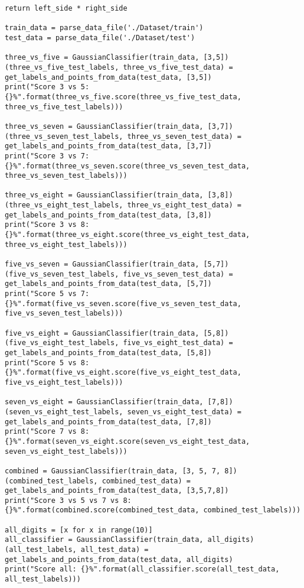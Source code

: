 \begin{lstlisting}[style]
        return left_side * right_side

train_data = parse_data_file('./Dataset/train')
test_data = parse_data_file('./Dataset/test')

three_vs_five = GaussianClassifier(train_data, [3,5])
(three_vs_five_test_labels, three_vs_five_test_data) = get_labels_and_points_from_data(test_data, [3,5])
print("Score 3 vs 5: {}%".format(three_vs_five.score(three_vs_five_test_data, three_vs_five_test_labels)))

three_vs_seven = GaussianClassifier(train_data, [3,7])
(three_vs_seven_test_labels, three_vs_seven_test_data) = get_labels_and_points_from_data(test_data, [3,7])
print("Score 3 vs 7: {}%".format(three_vs_seven.score(three_vs_seven_test_data, three_vs_seven_test_labels)))

three_vs_eight = GaussianClassifier(train_data, [3,8])
(three_vs_eight_test_labels, three_vs_eight_test_data) = get_labels_and_points_from_data(test_data, [3,8])
print("Score 3 vs 8: {}%".format(three_vs_eight.score(three_vs_eight_test_data, three_vs_eight_test_labels)))

five_vs_seven = GaussianClassifier(train_data, [5,7])
(five_vs_seven_test_labels, five_vs_seven_test_data) = get_labels_and_points_from_data(test_data, [5,7])
print("Score 5 vs 7: {}%".format(five_vs_seven.score(five_vs_seven_test_data, five_vs_seven_test_labels)))

five_vs_eight = GaussianClassifier(train_data, [5,8])
(five_vs_eight_test_labels, five_vs_eight_test_data) = get_labels_and_points_from_data(test_data, [5,8])
print("Score 5 vs 8: {}%".format(five_vs_eight.score(five_vs_eight_test_data, five_vs_eight_test_labels)))

seven_vs_eight = GaussianClassifier(train_data, [7,8])
(seven_vs_eight_test_labels, seven_vs_eight_test_data) = get_labels_and_points_from_data(test_data, [7,8])
print("Score 7 vs 8: {}%".format(seven_vs_eight.score(seven_vs_eight_test_data, seven_vs_eight_test_labels)))

combined = GaussianClassifier(train_data, [3, 5, 7, 8])
(combined_test_labels, combined_test_data) = get_labels_and_points_from_data(test_data, [3,5,7,8])
print("Score 3 vs 5 vs 7 vs 8: {}%".format(combined.score(combined_test_data, combined_test_labels)))

all_digits = [x for x in range(10)]
all_classifier = GaussianClassifier(train_data, all_digits)
(all_test_labels, all_test_data) = get_labels_and_points_from_data(test_data, all_digits)
print("Score all: {}%".format(all_classifier.score(all_test_data, all_test_labels)))

\end{lstlisting}

